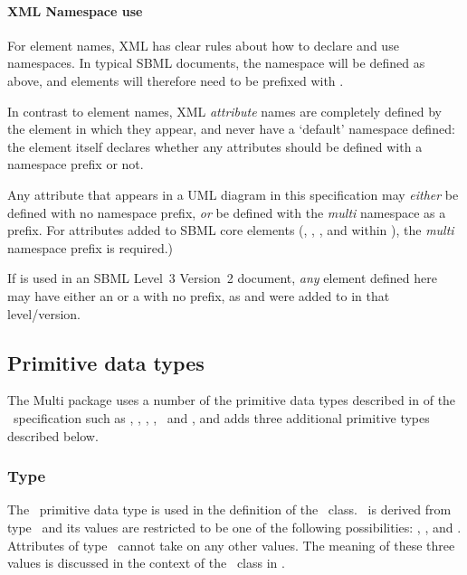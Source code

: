 \begin{blockChanged}
\paragraph{XML Namespace use}

For element names, XML has clear rules about how to declare and use namespaces.  In typical SBML documents, the \multi namespace will be defined as above, and elements will therefore need to be prefixed with .

In contrast to element names, XML \emph{attribute} names are completely defined by the element in which they appear, and never have a `default' namespace defined:  the element itself declares whether any attributes should be defined with a namespace prefix or not.  

Any attribute that appears in a UML diagram in this specification may \emph{either} be defined with no namespace prefix, \emph{or} be defined with the \emph{multi} namespace as a prefix.  For attributes added to SBML core elements (\Compartment, \Species, \SimpleSpeciesReference, and within \textbf{}\xspace), the \emph{multi} namespace prefix is required.)

If \multi is used in an SBML Level~3 Version~2 document, \emph{any} element defined here may have either an  or a  with no prefix, as  and  were added to \SBase in that level/version.   

\end{blockChanged}


\subsection{Primitive data types}
\label{def:Primitive_data_types}

The Multi package uses a number of the primitive data types described in  of the \SbmlLevelThreeCoreWC\ specification such as \SIdPT, \SIdRefPT, \stringPT, \booleanPT, \intPT\ and \positiveIntegerPT, and adds three additional primitive types described below.

\subsubsection{Type \BindingStatusPT}
\label{def:Primtype:BindingStatus}

The \BindingStatusPT\ primitive data type is used in the definition of the \OutwardBindingSite\ class.  \BindingStatusPT\ is derived from type \stringPT\ and its values are restricted to be one of the following possibilities: , , and .  Attributes of type \BindingStatusPT\ cannot take on any other values.  The meaning of these three values is discussed in the context of the \OutwardBindingSite\ class in .

